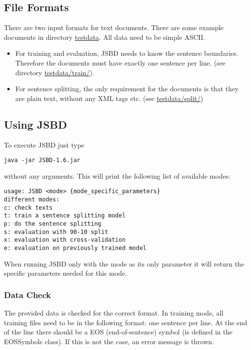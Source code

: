 \documentclass[11pt,a4paper,halfparskip]{scrartcl}
\begin{document}
\subsection{File Formats}
\label{sec_formats}
There are two input formats for text documents. There are some example
documents in directory \url{testdata}. All data need to be simple
ASCII.
\begin{itemize}
\item For training and evaluation, JSBD needs to know the sentence
  boundaries.  Therefore the documents must have exactly one sentence
  per line. (see directory \url{testdata/train/}).
\item For sentence splitting, the only requirement for the documents
  is that they are plain text, without any XML tags etc. (see
  \url{testdata/split/})
\end{itemize}


\subsection{Using JSBD}

To execute JSBD just type 

\begin{verbatim}
java -jar JSBD-1.6.jar
\end{verbatim}

without any arguments. This will print the following list of available
modes:

\begin{verbatim}
usage: JSBD <mode> {mode_specific_parameters}
different modes:
c: check texts
t: train a sentence splitting model
p: do the sentence splitting
s: evaluation with 90-10 split
x: evaluation with cross-validation
e: evaluation on previously trained model
\end{verbatim}

When running JSBD only with the mode as its only parameter it will
return the specific parameters needed for this mode.

\subsubsection{Data Check}

The provided data is checked for the correct format. In training mode,
all training files need to be in the following format: one sentence
per line. At the end of the line there should be a EOS
(end-of-sentence) symbol (is defined in the EOSSymbols class). If this
is not the case, an error message is thrown.
\end{document}
